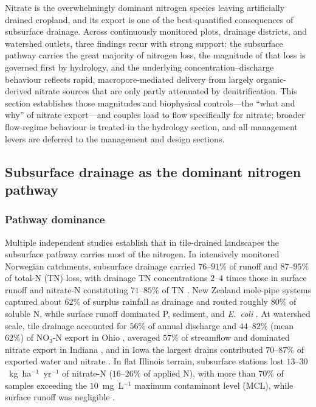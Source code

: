 Nitrate is the overwhelmingly dominant nitrogen species leaving artificially
drained cropland, and its export is one of the best-quantified consequences of
subsurface drainage. Across continuously monitored plots, drainage districts,
and watershed outlets, three findings recur with strong support: the
subsurface pathway carries the great majority of nitrogen loss, the magnitude
of that loss is governed first by hydrology, and the underlying
concentration--discharge behaviour reflects rapid, macropore-mediated delivery
from largely organic-derived nitrate sources that are only partly attenuated by
denitrification. This section establishes those magnitudes and biophysical
controls---the ``what and why'' of nitrate export---and couples load to flow
specifically for nitrate; broader flow-regime behaviour is treated in the
hydrology section, and all management levers are deferred to the management and
design sections.

\subsection{Subsurface drainage as the dominant nitrogen pathway}

\subsubsection{Pathway dominance}

Multiple independent studies establish that in tile-drained landscapes the
subsurface pathway carries most of the nitrogen. In intensively monitored
Norwegian catchments, subsurface drainage carried $76$--$91\%$ of runoff and
$87$--$95\%$ of total-N (TN) loss, with drainage TN concentrations $2$--$4$
times those in surface runoff and nitrate-N constituting $71$--$85\%$ of TN
\parencite{Bechmann2014}. New Zealand mole-pipe systems captured about $62\%$
of surplus rainfall as drainage and routed roughly $80\%$ of soluble N, while
surface runoff dominated P, sediment, and \emph{E.\ coli}
\parencite{Monaghan2016}. At watershed scale, tile drainage accounted for
$56\%$ of annual discharge and $44$--$82\%$ (mean $62\%$) of NO$_3$-N export in
Ohio \parencite{Williams2015}, averaged $57\%$ of streamflow and dominated
nitrate export in Indiana \parencite{Grose2022}, and in Iowa the largest drains
contributed $70$--$87\%$ of exported water and nitrate \parencite{Coupe2020}.
In flat Illinois terrain, subsurface stations lost
$13$--$30$~kg~ha$^{-1}$~yr$^{-1}$ of nitrate-N ($16$--$26\%$ of applied N), with
more than $70\%$ of samples exceeding the $10$~mg~L$^{-1}$ maximum contaminant
level (MCL), while surface runoff was negligible \parencite{Dattamudi2020}.

